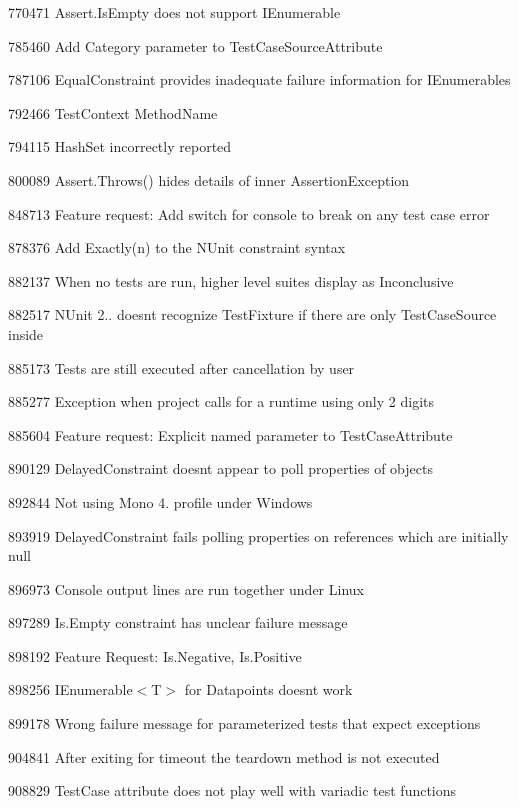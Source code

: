 \begin{DoxyItemize}
\item 770471 Assert.\+Is\+Empty does not support I\+Enumerable
\item 785460 Add Category parameter to Test\+Case\+Source\+Attribute
\item 787106 Equal\+Constraint provides inadequate failure information for I\+Enumerables
\item 792466 Test\+Context Method\+Name
\item 794115 Hash\+Set incorrectly reported
\item 800089 Assert.\+Throws() hides details of inner Assertion\+Exception
\item 848713 Feature request\+: Add switch for console to break on any test case error
\item 878376 Add \textquotesingle{}Exactly(n)\textquotesingle{} to the N\+Unit constraint syntax
\item 882137 When no tests are run, higher level suites display as Inconclusive
\item 882517 N\+Unit 2.. doesn\textquotesingle{}t recognize Test\+Fixture if there are only Test\+Case\+Source inside
\item 885173 Tests are still executed after cancellation by user
\item 885277 Exception when project calls for a runtime using only 2 digits
\item 885604 Feature request\+: Explicit named parameter to Test\+Case\+Attribute
\item 890129 Delayed\+Constraint doesn\textquotesingle{}t appear to poll properties of objects
\item 892844 Not using Mono 4. profile under Windows
\item 893919 Delayed\+Constraint fails polling properties on references which are initially null
\item 896973 Console output lines are run together under Linux
\item 897289 Is.\+Empty constraint has unclear failure message
\item 898192 Feature Request\+: Is.\+Negative, Is.\+Positive
\item 898256 {\ttfamily I\+Enumerable$<$T$>$} for Datapoints doesn\textquotesingle{}t work
\item 899178 Wrong failure message for parameterized tests that expect exceptions
\item 904841 After exiting for timeout the teardown method is not executed
\item 908829 Test\+Case attribute does not play well with variadic test functions

\end{DoxyItemize}
